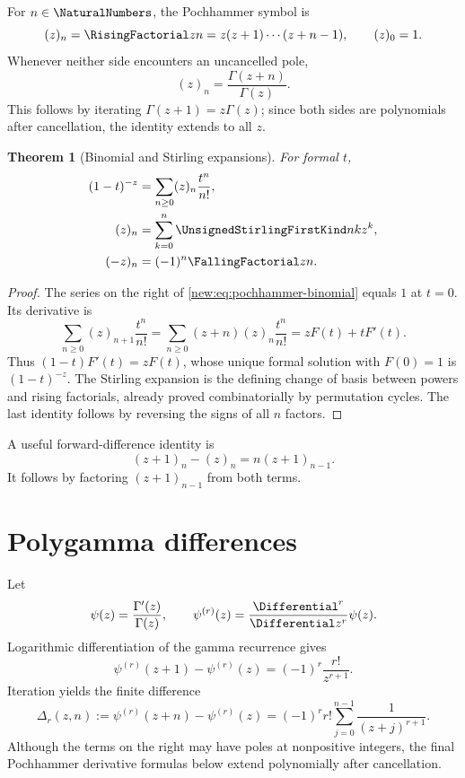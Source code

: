 \documentclass[11pt,a4paper,oneside,openany]{book}
\newtheorem{theorem}{Theorem}[chapter]
\theoremstyle{definition}
\theoremstyle{remark}
\begin{document}
For $n\in\NaturalNumbers$, the Pochhammer symbol is
\[
 (z)_n=\RisingFactorial z n=z(z+1)\cdots(z+n-1),\qquad (z)_0=1.
\]
Whenever neither side encounters an uncancelled pole,
\begin{equation}
 (z)_n=\frac{\Gamma(z+n)}{\Gamma(z)}.
 \label{new:eq:pochhammer-gamma}
\end{equation}
This follows by iterating $\Gamma(z+1)=z\Gamma(z)$; since both sides are
polynomials after cancellation, the identity extends to all $z$.

\begin{theorem}[Binomial and Stirling expansions]
For formal $t$,
\begin{align}
 (1-t)^{-z}&=\sum_{n\ge0}(z)_n\frac{t^n}{n!},
 \label{new:eq:pochhammer-binomial}\\
 (z)_n&=\sum_{k=0}^n\UnsignedStirlingFirstKind nk z^k,
 \label{new:eq:pochhammer-stirling}\\
 (-z)_n&=(-1)^n\FallingFactorial z n.
 \label{new:eq:pochhammer-falling}
\end{align}
\end{theorem}

\begin{proof}
The series on the right of \eqref{new:eq:pochhammer-binomial} equals $1$ at
$t=0$.  Its derivative is
\[
 \sum_{n\ge0}(z)_{n+1}\frac{t^n}{n!}
 =\sum_{n\ge0}(z+n)(z)_n\frac{t^n}{n!}
 =zF(t)+tF'(t).
\]
Thus $(1-t)F'(t)=zF(t)$, whose unique formal solution with $F(0)=1$ is
$(1-t)^{-z}$.  The Stirling expansion is the defining change of basis between
powers and rising factorials, already proved combinatorially by permutation
cycles.  The last identity follows by reversing the signs of all $n$ factors.
\end{proof}

A useful forward-difference identity is
\begin{equation}
 (z+1)_n-(z)_n=n(z+1)_{n-1}.
 \label{new:eq:pochhammer-difference}
\end{equation}
It follows by factoring $(z+1)_{n-1}$ from both terms.

\section{Polygamma differences}

Let
\[
 \psi(z)=\frac{\Gamma'(z)}{\Gamma(z)},
 \qquad \psi^{(r)}(z)=\frac{\Differential^r}{\Differential z^r}\psi(z).
\]
Logarithmic differentiation of the gamma recurrence gives
\begin{equation}
 \psi^{(r)}(z+1)-\psi^{(r)}(z)
 =(-1)^r\frac{r!}{z^{r+1}}.
 \label{new:eq:polygamma-step}
\end{equation}
Iteration yields the finite difference
\begin{equation}
 \Delta_r(z,n):=\psi^{(r)}(z+n)-\psi^{(r)}(z)
 =(-1)^rr!\sum_{j=0}^{n-1}\frac1{(z+j)^{r+1}}.
 \label{new:eq:polygamma-finite}
\end{equation}
Although the terms on the right may have poles at nonpositive integers, the
final Pochhammer derivative formulas below extend polynomially after
cancellation.
\end{document}
